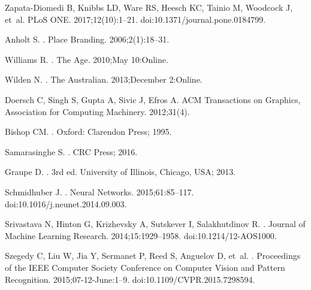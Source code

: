 Zapata-Diomedi B, Knibbs LD, Ware RS, Heesch KC, Tainio M, Woodcock J, et~al.
\newblock PLoS ONE. 2017;12(10):1--21.
\newblock doi:{10.1371/journal.pone.0184799}.

Anholt S.
.
\newblock Place Branding. 2006;2(1):18--31.

Williams R.
.
\newblock The Age. 2010;May 10:Online.

Wilden N.
.
\newblock The Australian. 2013;December 2:Online.

Doersch C, Singh S, Gupta A, Sivic J, Efros A.
\newblock ACM Transactions on Graphics, Association for Computing Machinery.
  2012;31(4).

Bishop CM.
.
\newblock Oxford: Clarendon Press; 1995.

Samarasinghe S.
.
\newblock CRC Press; 2016.

Graupe D.
.
\newblock 3rd ed. University of Illinois, Chicago, USA; 2013.

Schmidhuber J.
.
\newblock Neural Networks. 2015;61:85--117.
\newblock doi:{10.1016/j.neunet.2014.09.003}.

Srivastava N, Hinton G, Krizhevsky A, Sutskever I, Salakhutdinov R.
.
\newblock Journal of Machine Learning Research. 2014;15:1929--1958.
\newblock doi:{10.1214/12-AOS1000}.

Szegedy C, Liu W, Jia Y, Sermanet P, Reed S, Anguelov D, et~al.
.
\newblock Proceedings of the IEEE Computer Society Conference on Computer
  Vision and Pattern Recognition. 2015;07-12-June:1--9.
\newblock doi:{10.1109/CVPR.2015.7298594}.

